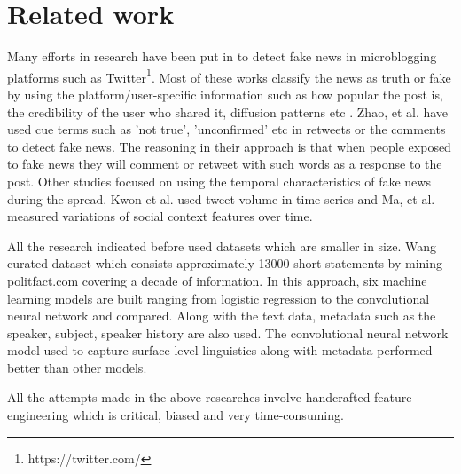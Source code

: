 \documentclass[a4paper, 11pt]{article}
\begin{document}
\section{Related work}


Many efforts in research have been put in to detect fake news in microblogging platforms such as Twitter\footnote{https://twitter.com/}. Most of these works classify the news as truth or fake by using the platform/user-specific information such as how popular the post is, the credibility of the user who shared it, diffusion patterns etc \cite{Liu2015} \cite{Ma2015}. Zhao, et al. \cite{Zhao2015} have used cue terms such as 'not true', 'unconfirmed' etc in retweets or the comments to detect fake news. The reasoning in their approach is that when people exposed to fake news they will comment or retweet with such words as a response to the post. Other studies focused on using the temporal characteristics of fake news during the spread. Kwon et al.\cite{Kwon2013} used tweet volume in time series and Ma, et al.\cite{Ma2015} measured variations of social context features over time. 

All the research indicated before used datasets which are smaller in size. Wang \cite{Wang2017} curated dataset which consists approximately 13000 short statements by mining politfact.com covering a decade of information. In this approach, six machine learning models are built ranging from logistic regression to the convolutional neural network and compared. Along with the text data, metadata such as the speaker, subject, speaker history are also used. The convolutional neural network model used to capture surface level linguistics along with metadata performed better than other models.

All the attempts made in the above researches involve handcrafted feature engineering which is critical, biased and very time-consuming.
\end{document}
